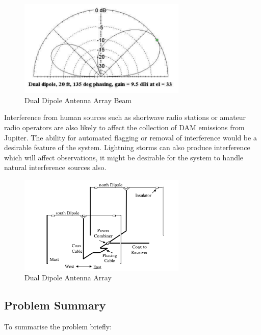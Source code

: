 \documentclass[runningheads,a4paper]{llncs}
\begin{document}
%
\begin{figure}[here]
\centering
\includegraphics[width=8cm]{images/09}
\caption{Dual Dipole Antenna Array Beam\citep{nasa12}}
\label{fig:dual_dipole_antenna_array_beam}
\end{figure}
%


Interference from human sources such as shortwave radio stations or amateur radio operators are also likely to affect the collection of \gls{DAM} emissions from Jupiter. The ability for automated flagging or removal of interference would be a desirable feature of the system. Lightning storms can also produce interference which will affect observations, it might be desirable for the system to handle natural interference sources also.

%
\begin{figure}[here]
\centering
\includegraphics[width=8cm]{images/08}
\caption{Dual Dipole Antenna Array \citep{nasa12}}
\label{fig:dual_dipole_antenna_array}
\end{figure}
%

\subsection*{Problem Summary}

To summarise the problem briefly:
\end{document}
